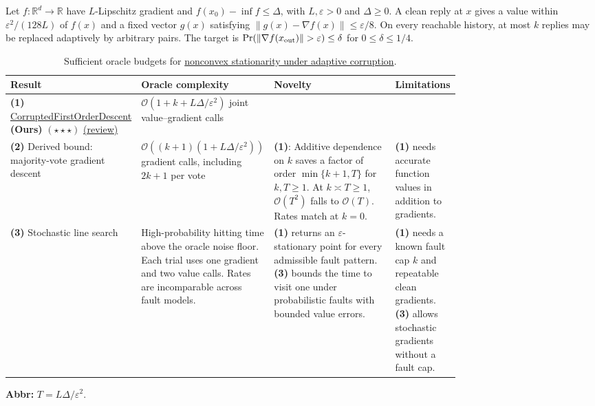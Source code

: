 \begin{table}[tp]
\centering
\caption{Sufficient oracle budgets for \href{https://github.com/k3nfalt/longtails/blob/main/LongTails/Setups/CorruptedFirstOrderNonconvex.lean}{nonconvex stationarity under adaptive corruption}.}\label{tab:CorruptedFirstOrderNonconvex}
\parbox{\linewidth}{\footnotesize Let $f:\mathbb R^d\to\mathbb R$ have $L$-Lipschitz gradient and $f(x_0)-\inf f\le\Delta$, with $L,\varepsilon>0$ and $\Delta\ge0$. A clean reply at $x$ gives a value within $\varepsilon^2/(128L)$ of $f(x)$ and a fixed vector $g(x)$ satisfying $\|g(x)-\nabla f(x)\|\le\varepsilon/8$. On every reachable history, at most $k$ replies may be replaced adaptively by arbitrary pairs. The target is $\Pr(\|\nabla f(x_{\rm out})\|>\varepsilon)\le\delta$ for $0\le\delta\le1/4$.}\par\smallskip
\begin{threeparttable}
\footnotesize
\setlength{\tabcolsep}{4pt}\renewcommand{\arraystretch}{1.25}
\begin{tabularx}{\linewidth}{@{}>{\raggedright\arraybackslash}p{0.20\linewidth}>{\raggedright\arraybackslash}p{0.28\linewidth}>{\raggedright\arraybackslash}p{0.28\linewidth}>{\raggedright\arraybackslash}X@{}}
\toprule
\textbf{Result} & \textbf{Oracle complexity} & \textbf{Novelty} & \textbf{Limitations} \\
\midrule
\textbf{(1)} \href{https://github.com/k3nfalt/longtails/blob/main/LongTails/Theorems/CorruptedFirstOrderDescent.lean}{Corrupted\allowbreak First\allowbreak Order\allowbreak Descent} \textbf{(Ours)} $(\star\star\star)$ \href{https://github.com/k3nfalt/longtails/blob/main/scripts/reviews/CorruptedFirstOrderDescent.md}{(review)}
& $\mathcal{O}(1+k+L\Delta/\varepsilon^2)$ joint value--gradient calls & & \\
\midrule[1.2pt]
\textbf{(2)} Derived bound: majority-vote gradient descent \citep[\S1.2.3]{nsscNesterov2018}
& $\mathcal{O}((k+1)(1+L\Delta/\varepsilon^2))$ gradient calls, including $2k+1$ per vote
& \textbf{(1)}: Additive dependence on $k$ saves a factor of order $\min\{k+1,T\}$ for $k,T\ge1$. At $k\asymp T\ge1$, $\mathcal{O}(T^2)$ falls to $\mathcal{O}(T)$. Rates match at $k=0$.
& \textbf{(1)} needs accurate function values in addition to gradients. \\
\midrule
\textbf{(3)} Stochastic line search \citep[Thm.~6, corrupted value oracle]{cfodScheinbergXie2025v1}
& High-probability hitting time above the oracle noise floor. Each trial uses one gradient and two value calls. Rates are incomparable across fault models.
& \textbf{(1)} returns an $\varepsilon$-stationary point for every admissible fault pattern. \textbf{(3)} bounds the time to visit one under probabilistic faults with bounded value errors.
& \textbf{(1)} needs a known fault cap $k$ and repeatable clean gradients. \textbf{(3)} allows stochastic gradients without a fault cap. \\
\bottomrule
\end{tabularx}
\begin{tablenotes}[flushleft]\footnotesize
\item[] \textbf{Abbr:} $T=L\Delta/\varepsilon^2$.
\end{tablenotes}
\end{threeparttable}
\end{table}
